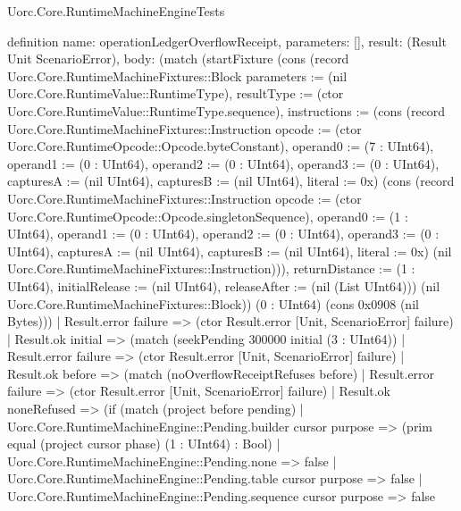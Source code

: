 \begin{lexlean}{Uorc.Core.RuntimeMachineEngineTests}
\begin{semanticmodule}
definition{
  name: operationLedgerOverflowReceipt,
  parameters: [],
  result: (Result Unit ScenarioError),
  body: (match (startFixture (cons (record Uorc.Core.RuntimeMachineFixtures::Block {parameters := (nil Uorc.Core.RuntimeValue::RuntimeType), resultType := (ctor Uorc.Core.RuntimeValue::RuntimeType.sequence), instructions := (cons (record Uorc.Core.RuntimeMachineFixtures::Instruction {opcode := (ctor Uorc.Core.RuntimeOpcode::Opcode.byteConstant), operand0 := (7 : UInt64), operand1 := (0 : UInt64), operand2 := (0 : UInt64), operand3 := (0 : UInt64), capturesA := (nil UInt64), capturesB := (nil UInt64), literal := 0x}) (cons (record Uorc.Core.RuntimeMachineFixtures::Instruction {opcode := (ctor Uorc.Core.RuntimeOpcode::Opcode.singletonSequence), operand0 := (1 : UInt64), operand1 := (0 : UInt64), operand2 := (0 : UInt64), operand3 := (0 : UInt64), capturesA := (nil UInt64), capturesB := (nil UInt64), literal := 0x}) (nil Uorc.Core.RuntimeMachineFixtures::Instruction))), returnDistance := (1 : UInt64), initialRelease := (nil UInt64), releaseAfter := (nil (List UInt64))}) (nil Uorc.Core.RuntimeMachineFixtures::Block)) (0 : UInt64) (cons 0x0908 (nil Bytes)))
    | Result.error failure => (ctor Result.error [Unit, ScenarioError] failure)
    | Result.ok initial => (match (seekPending 300000 initial (3 : UInt64))
      | Result.error failure => (ctor Result.error [Unit, ScenarioError] failure)
      | Result.ok before => (match (noOverflowReceiptRefuses before)
        | Result.error failure => (ctor Result.error [Unit, ScenarioError] failure)
        | Result.ok noneRefused => (if (match (project before pending)
          | Uorc.Core.RuntimeMachineEngine::Pending.builder cursor purpose => (prim equal (project cursor phase) (1 : UInt64) : Bool)
          | Uorc.Core.RuntimeMachineEngine::Pending.none => false
          | Uorc.Core.RuntimeMachineEngine::Pending.table cursor purpose => false
          | Uorc.Core.RuntimeMachineEngine::Pending.sequence cursor purpose => false
}
\end{semanticmodule}
\end{lexlean}
